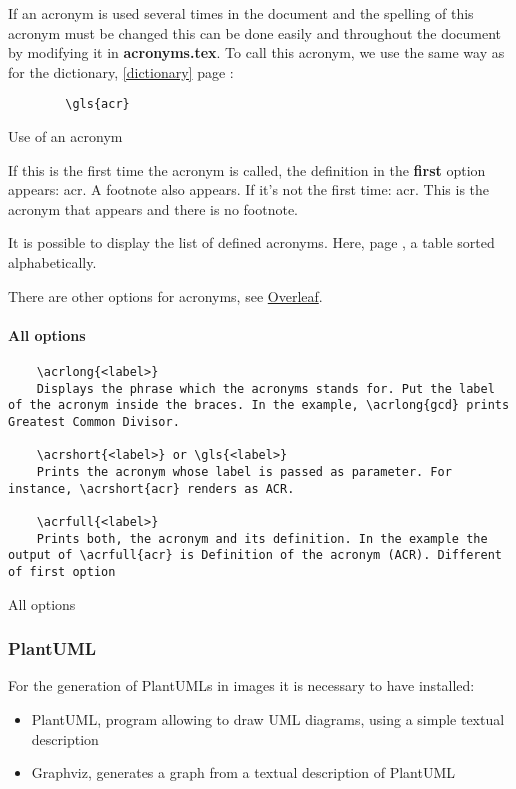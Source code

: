 If an acronym is used several times in the document and the spelling of this acronym must be changed
this can be done easily and throughout the document by modifying it in \textbf{acronyms.tex}.
To call this acronym, we use the same way as for the dictionary, \ref{dictionary} page \pageref{dictionary} :
\begin{code}
    \begin{verbatim}
        \gls{acr}
\end{verbatim}
    \caption{Use of an acronym}
\end{code}

If this is the first time the acronym is called, the definition in the \textbf{first} option appears: \gls{acr}.
A footnote also appears. \newline
If it's not the first time: \gls{acr}. This is the acronym that appears and there is no footnote. \newline

It is possible to display the list of defined acronyms. Here, page \pageref{acronyms}, a table sorted alphabetically.

There are other options for acronyms, see \href{https://fr.overleaf.com/learn/latex/Glossaries}{Overleaf}.

\paragraph{All options}

\begin{code}
    \begin{verbatim}
    \acrlong{<label>}
    Displays the phrase which the acronyms stands for. Put the label of the acronym inside the braces. In the example, \acrlong{gcd} prints Greatest Common Divisor.

    \acrshort{<label>} or \gls{<label>}
    Prints the acronym whose label is passed as parameter. For instance, \acrshort{acr} renders as ACR.

    \acrfull{<label>}
    Prints both, the acronym and its definition. In the example the output of \acrfull{acr} is Definition of the acronym (ACR). Different of first option
    \end{verbatim}
    \caption{All options}
\end{code}

\subsubsection{PlantUML} \label{plamtuml}
For the generation of PlantUMLs in images it is necessary to have installed:
\begin{itemize}
    \item PlantUML, program allowing to draw UML diagrams, using a simple textual description
    \item Graphviz, generates a graph from a textual description of PlantUML
\end{itemize}

